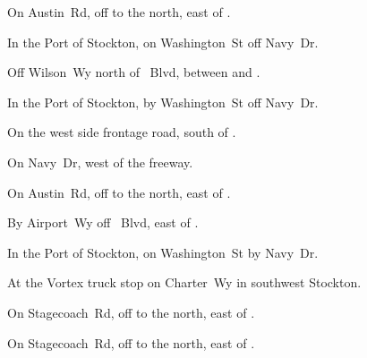 
\begin{LocationList}

On Austin~Rd, off  to the north, east of .

In the Port of Stockton, on Washington~St off Navy~Dr.

Off Wilson~Wy north of \MLKing~Blvd, between   and  .

In the Port of Stockton, by Washington~St off Navy~Dr.

On the west side  frontage road, south of .

On Navy~Dr, west of the freeway.

On Austin~Rd, off  to the north, east of .

\Location{\RecruitmentAgency \Recruitment}
By Airport~Wy off \MLKing~Blvd, east of  .

In the Port of Stockton, on Washington~St by Navy~Dr.

At the Vortex truck stop on  Charter~Wy in southwest Stockton.

On Stagecoach~Rd, off  to the north, east of .

On Stagecoach~Rd, off  to the north, east of .

\end{LocationList}
